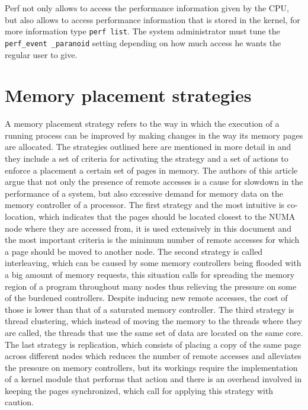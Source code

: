 Perf not only allows to access the performance information given by the CPU, but also allows to access performance information that is stored in the kernel, for more information type \texttt{perf list}. The system administrator must tune the \texttt{perf\_event \_paranoid} setting depending on how much access he wants the regular user to give. 

\section{Memory placement strategies}\label{section:placement strats}

A memory placement strategy refers to the way in which the execution of a running process can be improved by making changes in the way its memory pages are allocated. The strategies outlined here are mentioned in more detail in \cite{Dashti:2013} and they include a set of criteria for activating the strategy and a set of actions to enforce a placement a certain set of pages in memory. The authors of this article argue that not only the presence of remote accesses is a cause for slowdown in the performance of a system, but also excessive demand for memory data on the memory controller of a processor.
The first strategy and the most intuitive is co-location, which indicates that the pages should be located closest to the NUMA node where they are accessed from, it is used extensively in this document and the most important criteria is the minimum number of remote accesses for which a page should be moved to another node. The second strategy is called interleaving, which can be caused by some memory controllers being flooded with a big amount of memory requests, this situation calls for spreading the memory region of a program throughout many nodes thus relieving the pressure on some of the burdened controllers. Despite inducing new remote accesses, the cost of those is lower than that of a saturated memory controller. The third strategy is thread clustering, which instead of moving the memory to the threads where they are called, the threads that use the same set of data are located on the same core. The last strategy is replication, which consists of placing a copy of the same page across different nodes which reduces the number of remote accesses and alleviates the pressure on memory controllers, but its workings require the implementation of a kernel module that performs that action and there is an overhead involved in keeping the pages synchronized, which call for applying this strategy with caution.
